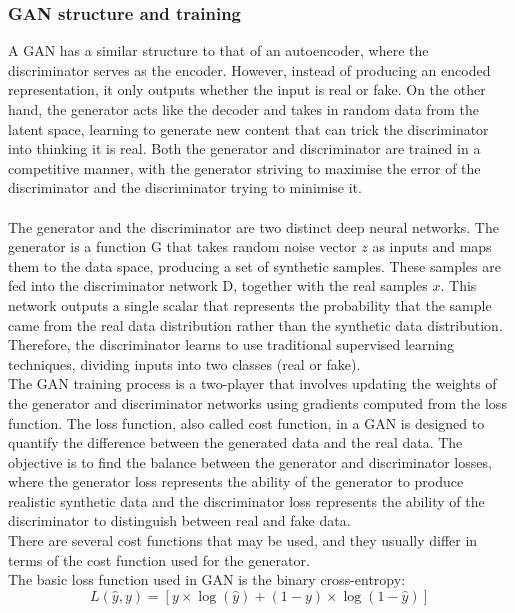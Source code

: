 \subsubsection{GAN structure and training}
\noindent A GAN has a similar structure to that of an autoencoder, where the discriminator serves as the encoder. However, instead of producing an encoded representation, it only outputs whether the input is real or fake. On the other hand, the generator acts like the decoder and takes in random data from the latent space, learning to generate new content that can trick the discriminator into thinking it is real. Both the generator and discriminator are trained in a competitive manner, with the generator striving to maximise the error of the discriminator and the discriminator trying to minimise it.\\
\\
The generator and the discriminator are two distinct deep neural networks. The generator is a function G that takes random noise vector $z$ as inputs and maps them to the data space, producing a set of synthetic samples. These samples are fed into the discriminator network D, together with the real samples $x$. This network outputs a single scalar that represents the probability that the sample came from the real data distribution rather than the synthetic data distribution. Therefore, the discriminator learns to use traditional supervised learning techniques, dividing inputs into two classes (real or fake).\\
The GAN training process is a two-player that involves updating the weights of the generator and discriminator networks using gradients computed from the loss function. The loss function, also called cost function, in a GAN is designed to quantify the difference between the generated data and the real data. The objective is to find the balance between the generator and discriminator losses, where the generator loss represents the ability of the generator to produce realistic synthetic data and the discriminator loss represents the ability of the discriminator to distinguish between real and fake data.\\
There are several cost functions that may be used, and they usually differ in terms of the cost function used for the generator.\\
The basic loss function used in GAN is the binary cross-entropy:
\begin{equation}
\label{eq:binariCross-entropy}
L(\hat{y}, y) = [y \times \log (\hat{y}) + (1-y)\times \log (1-\hat{y})]
\end{equation}
